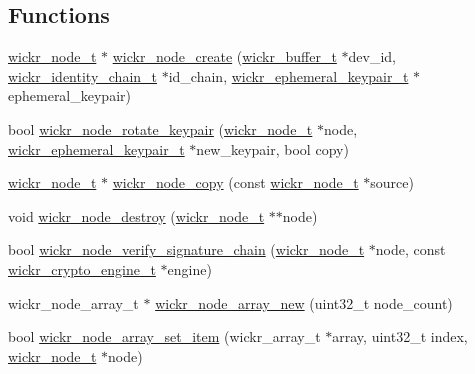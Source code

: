 \subsection*{Functions}
\begin{DoxyCompactItemize}
\item 
\mbox{\hyperlink{structwickr__node}{wickr\+\_\+node\+\_\+t}} $\ast$ \mbox{\hyperlink{group__wickr__node_ga293b1210648e2db5449be23fe0f3e644}{wickr\+\_\+node\+\_\+create}} (\mbox{\hyperlink{structwickr__buffer}{wickr\+\_\+buffer\+\_\+t}} $\ast$dev\+\_\+id, \mbox{\hyperlink{structwickr__identity__chain}{wickr\+\_\+identity\+\_\+chain\+\_\+t}} $\ast$id\+\_\+chain, \mbox{\hyperlink{structwickr__ephemeral__keypair}{wickr\+\_\+ephemeral\+\_\+keypair\+\_\+t}} $\ast$ephemeral\+\_\+keypair)
\item 
bool \mbox{\hyperlink{group__wickr__node_ga2ed650b947df7316cf0f915805ac5aa4}{wickr\+\_\+node\+\_\+rotate\+\_\+keypair}} (\mbox{\hyperlink{structwickr__node}{wickr\+\_\+node\+\_\+t}} $\ast$node, \mbox{\hyperlink{structwickr__ephemeral__keypair}{wickr\+\_\+ephemeral\+\_\+keypair\+\_\+t}} $\ast$new\+\_\+keypair, bool copy)
\item 
\mbox{\hyperlink{structwickr__node}{wickr\+\_\+node\+\_\+t}} $\ast$ \mbox{\hyperlink{group__wickr__node_ga393c4fb42022fdc6f4336a62dbc7af91}{wickr\+\_\+node\+\_\+copy}} (const \mbox{\hyperlink{structwickr__node}{wickr\+\_\+node\+\_\+t}} $\ast$source)
\item 
void \mbox{\hyperlink{group__wickr__node_ga6acf07885403d9df6baad36a8d797f73}{wickr\+\_\+node\+\_\+destroy}} (\mbox{\hyperlink{structwickr__node}{wickr\+\_\+node\+\_\+t}} $\ast$$\ast$node)
\item 
bool \mbox{\hyperlink{group__wickr__node_gac9e2d96e9109590124b2fd05a8826c1d}{wickr\+\_\+node\+\_\+verify\+\_\+signature\+\_\+chain}} (\mbox{\hyperlink{structwickr__node}{wickr\+\_\+node\+\_\+t}} $\ast$node, const \mbox{\hyperlink{structwickr__crypto__engine}{wickr\+\_\+crypto\+\_\+engine\+\_\+t}} $\ast$engine)
\item 
wickr\+\_\+node\+\_\+array\+\_\+t $\ast$ \mbox{\hyperlink{group__wickr__node_ga504ebe707aa003032c4ac8044d73ee92}{wickr\+\_\+node\+\_\+array\+\_\+new}} (uint32\+\_\+t node\+\_\+count)
\item 
bool \mbox{\hyperlink{group__wickr__node_gae511a75489982fc2e90271be63d9d753}{wickr\+\_\+node\+\_\+array\+\_\+set\+\_\+item}} (wickr\+\_\+array\+\_\+t $\ast$array, uint32\+\_\+t index, \mbox{\hyperlink{structwickr__node}{wickr\+\_\+node\+\_\+t}} $\ast$node)
\item 
$$
\end{DoxyCompactItemize}
